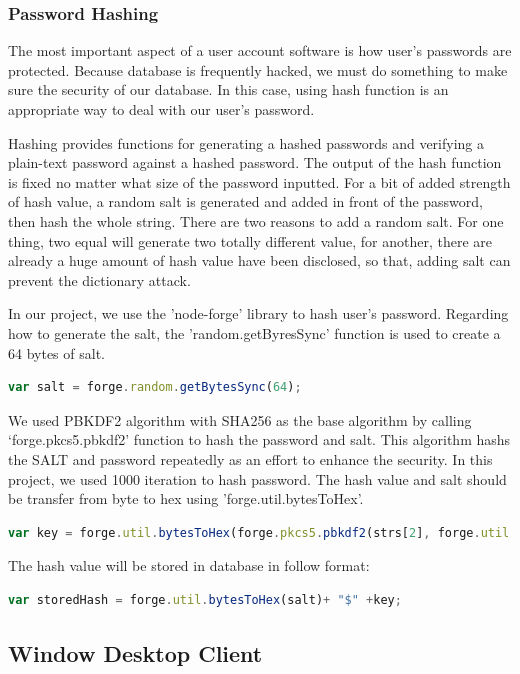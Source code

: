 \documentclass[a4paper,11pt]{article}
\begin{document}
\subsubsection{Password Hashing}
The most important aspect of a user account software is how user’s passwords are protected. Because database is frequently hacked, we must do something to make sure the security of our database. In this case, using hash function is an appropriate way to deal with our user’s password.

Hashing provides functions for generating a hashed passwords and verifying a plain-text password against a hashed password. The output of the hash function is fixed no matter what size of the password inputted. For a bit of added strength of hash value, a random salt is generated and added in front of the password, then hash the whole string. There are two reasons to add a random salt. For one thing, two equal will generate two totally different value, for another, there are already a huge amount of hash value have been disclosed, so that, adding salt can prevent the dictionary attack.

In our project, we use the 'node-forge' library to hash user’s password. Regarding how to generate the salt, the 'random.getByresSync' function is used to create a 64 bytes of salt.
\begin{lstlisting}[language=javascript]
var salt = forge.random.getBytesSync(64);
\end{lstlisting}
We used PBKDF2 algorithm with SHA256 as the base algorithm by calling ‘forge.pkcs5.pbkdf2’ function to hash the password and salt. This algorithm hashs the SALT and password repeatedly as an effort to enhance the security. In this project, we used 1000 iteration to hash password. The hash value and salt should be transfer from byte to hex using 'forge.util.bytesToHex'.
\begin{lstlisting}[language=javascript]
var key = forge.util.bytesToHex(forge.pkcs5.pbkdf2(strs[2], forge.util.bytesToHex(salt), iteration, 32,'sha256'));
\end{lstlisting}
The hash value will be stored in database in follow format:
\begin{lstlisting}[language=javascript]
var storedHash = forge.util.bytesToHex(salt)+ "$" +key;
\end{lstlisting}

\subsection{Window Desktop Client}
\end{document}
